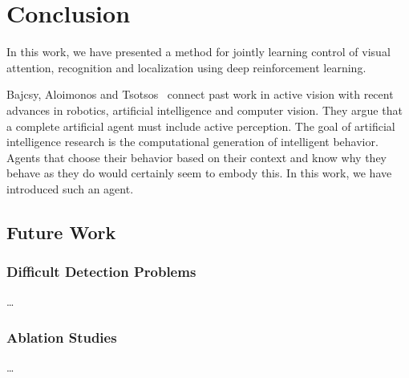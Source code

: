 \chapter{Conclusion}
\label{cha:conclusion}

% 

In this work, we have presented a method for jointly learning control of visual attention, recognition and localization using deep reinforcement learning.

Bajcsy, Aloimonos and Tsotsos~\cite{bajcsy_revisiting_2018} connect past work in active vision with recent advances in robotics, artificial intelligence and computer vision.
They argue that a complete artificial agent must include active perception.
The goal of artificial intelligence research is the computational generation of intelligent behavior.
Agents that choose their behavior based on their context and know why they behave as they do would certainly seem to embody this.
In this work, we have introduced such an agent.

\section{Future Work}

\subsection{Difficult Detection Problems}

\dots

\subsection{Ablation Studies}

\dots
